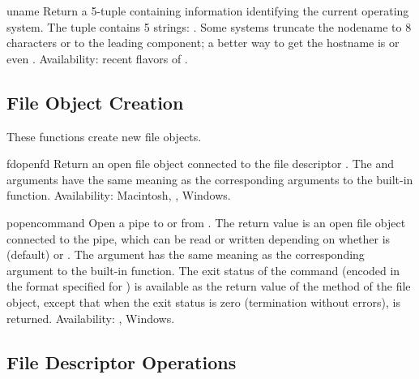 \begin{funcdesc}{uname}{}
Return a 5-tuple containing information identifying the current
operating system.  The tuple contains 5 strings:
.  Some systems truncate the nodename to 8
characters or to the leading component; a better way to get the
hostname is 
or even
.
Availability: recent flavors of \UNIX{}.
\end{funcdesc}



\subsection{File Object Creation \label{os-newstreams}}

These functions create new file objects.


\begin{funcdesc}{fdopen}{fd}
Return an open file object connected to the file descriptor .
The  and  arguments have the same meaning as
the corresponding arguments to the built-in 
function.
Availability: Macintosh, \UNIX{}, Windows.
\end{funcdesc}

\begin{funcdesc}{popen}{command}
Open a pipe to or from .  The return value is an open
file object connected to the pipe, which can be read or written
depending on whether  is  (default) or .
The  argument has the same meaning as the corresponding
argument to the built-in  function.  The exit status of
the command (encoded in the format specified for ) is
available as the return value of the  method of the file
object, except that when the exit status is zero (termination without
errors),  is returned.
Availability: \UNIX{}, Windows.
\end{funcdesc}



\subsection{File Descriptor Operations \label{os-fd-ops}}

